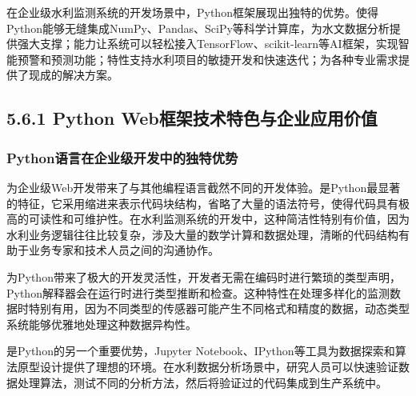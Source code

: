 在企业级水利监测系统的开发场景中，Python框架展现出独特的优势。使得Python能够无缝集成NumPy、Pandas、SciPy等科学计算库，为水文数据分析提供强大支撑；能力让系统可以轻松接入TensorFlow、scikit-learn等AI框架，实现智能预警和预测功能；特性支持水利项目的敏捷开发和快速迭代；为各种专业需求提供了现成的解决方案。

\hypertarget{python-webux6846ux67b6ux6280ux672fux7279ux8272ux4e0eux4f01ux4e1aux5e94ux7528ux4ef7ux503c}{%
\subsection{5.6.1 Python Web框架技术特色与企业应用价值}\label{python-webux6846ux67b6ux6280ux672fux7279ux8272ux4e0eux4f01ux4e1aux5e94ux7528ux4ef7ux503c}}

\hypertarget{pythonux8bedux8a00ux5728ux4f01ux4e1aux7ea7ux5f00ux53d1ux4e2dux7684ux72ecux7279ux4f18ux52bf}{%
\subsubsection{Python语言在企业级开发中的独特优势}\label{pythonux8bedux8a00ux5728ux4f01ux4e1aux7ea7ux5f00ux53d1ux4e2dux7684ux72ecux7279ux4f18ux52bf}}

为企业级Web开发带来了与其他编程语言截然不同的开发体验。是Python最显著的特征，它采用缩进来表示代码块结构，省略了大量的语法符号，使得代码具有极高的可读性和可维护性。在水利监测系统的开发中，这种简洁性特别有价值，因为水利业务逻辑往往比较复杂，涉及大量的数学计算和数据处理，清晰的代码结构有助于业务专家和技术人员之间的沟通协作。

为Python带来了极大的开发灵活性，开发者无需在编码时进行繁琐的类型声明，Python解释器会在运行时进行类型推断和检查。这种特性在处理多样化的监测数据时特别有用，因为不同类型的传感器可能产生不同格式和精度的数据，动态类型系统能够优雅地处理这种数据异构性。

是Python的另一个重要优势，Jupyter Notebook、IPython等工具为数据探索和算法原型设计提供了理想的环境。在水利数据分析场景中，研究人员可以快速验证数据处理算法，测试不同的分析方法，然后将验证过的代码集成到生产系统中。

